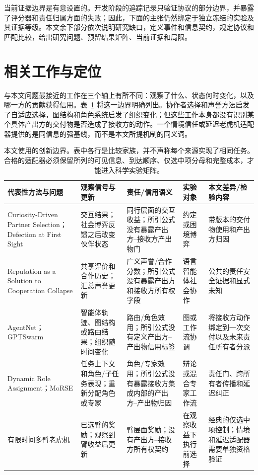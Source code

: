 \documentclass[UTF8,twocolumn]{ctexart}
\newcommand{\unknown}{\textsc{未知}}
\begin{document}
当前证据边界是有意设置的。开发阶段的追踪记录只验证协议的部分边界，并暴露了评分器和责任归属方面的失败；因此，下面的主张仍然绑定于独立冻结的实验及其证据等级。本文余下部分依次说明研究缺口，定义事件和信息契约，规定协议和匹配比较，给出研究问题、预留结果矩阵、当前证据和局限。

\section{相关工作与定位}

与本文问题最接近的工作在三个轴上有所不同：观察了什么、状态何时变化，以及哪一方的贡献获得信用。表~\ref{tab:novelty} 将这一边界明确列出。协作者选择和声誉方法启发了自适应选择，图结构和角色系统启发了组织变化；但这些工作本身都没有识别某个具体产出方的交付物是否造成了接收方的动作。一个情境信任或延迟老虎机适配器提供的是同信息的强基线，而不是本文所提机制的同义词。

\begin{table}[t]
\centering\scriptsize
\setlength{\tabcolsep}{3.2pt}
\begin{tabular}{p{}p{}p{}p{}p{}}
\toprule
代表性方法与问题 & 观察信号与更新 & 责任/信用语义 & 实验对象 & 本文差异/检验内容 \\
\midrule
Curiosity-Driven Partner Selection；Defection at First Sight \cite{leung2025partner,russell2026partner} & 交互结果；社会博弈反馈之后改变伙伴状态 & 同行层面的交互收益；所引公式没有暴露产出方--接收方产出物门 & 约定或困境博弈 & 带版本的交付物使用和产出方归因 \\
Reputation as a Solution to Cooperation Collapse \cite{ren2026reputation} & 共享评价和合作历史；汇总声誉更新 & 广义声誉/合作分数；所引公式没有暴露产出方和接收方所有权字段 & 语言智能体社会协作 & 公共的责任安全证据和显式 \unknown{} \\
AgentNet；GPTSwarm \cite{yang2025agentnet,zhuge2024gptswarm} & 智能体轨迹、图结构或路由结果；组织随时间变化 & 路由/角色效用；所引公式没有定义产出方--产出物信用标签 & 图或工作流协调 & 将接收方动作绑定到一次交付以及未来责任所有者分派 \\
Dynamic Role Assignment；MoRSE \cite{zhang2026dynamic,li2026morse} & 任务上下文和角色/子任务表现；重新分配角色或专家 & 角色/专家效用；所引公式没有暴露接收方集成内部的产出方--产出物归因 & 辩论或混合专家工作流 & 责任门、跨所有者传播和延迟纠正 \\
有限时间多臂老虎机 \cite{auer2002finite} & 已选臂的奖励；观察到臂收益后更新 & 臂层面奖励；没有产出方--接收方所有权契约 & 在观察收益下执行前选择 & 经典的仅选中项控制；情境和延迟适配器需要单独资格验证 \\
\bottomrule
\end{tabular}
\caption{本文使用的创新边界。表中各行是比较家族，并不声称每个来源实现了相同任务。合格的适配器必须保留所列的可见信息、到达顺序、仅选中项分母和完整成本，才能进入科学实验矩阵。}
\label{tab:novelty}
\end{table}
\end{document}
